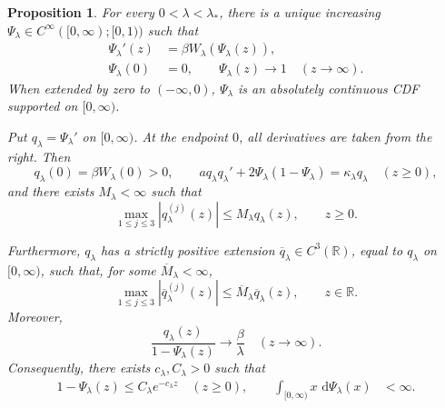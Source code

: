 \documentclass[a4paper,fleqn]{cas-sc}
\numberwithin{equation}{section}
\theoremstyle{plain}
\newtheorem{proposition}[theorem]{Proposition}
\theoremstyle{definition}
\newcommand{\dd}{\,\mathrm d}
\begin{document}
\begin{proposition}
\label{prop:hard-edge-distribution}
For every $0<\lambda<\lambda_*$, there is a unique increasing
$\Psi_\lambda\in C^\infty([0,\infty);[0,1))$ such that
\begin{equation}
\begin{aligned}
 \Psi_\lambda'(z)&=\beta W_\lambda(\Psi_\lambda(z)),\\
 \Psi_\lambda(0)&=0,\qquad
 \Psi_\lambda(z)\longrightarrow1
 \quad(z\to\infty).
\end{aligned}
 \label{eq:Psi-subcritical-definition}
\end{equation}
When extended by zero to $(-\infty,0)$, $\Psi_{\lambda}$ is an absolutely continuous CDF supported on
$[0,\infty)$.

Put $q_\lambda=\Psi_\lambda'$ on $[0,\infty)$. At the endpoint $0$,
all derivatives are taken from the right.  Then
\begin{equation}
 q_\lambda(0)=\beta W_\lambda(0)>0,
 \qquad
 a q_\lambda q_\lambda'
 +2\Psi_\lambda(1-\Psi_\lambda)
 =\kappa_\lambda q_\lambda
 \quad(z\ge0),
 \label{eq:lower-profile-equation}
\end{equation}
and there exists $M_\lambda<\infty$ such that
\begin{equation}
 \max_{1\le j\le3}|q_\lambda^{(j)}(z)|
 \le M_\lambda q_\lambda(z),
 \qquad z\ge0.
 \label{eq:subcritical-relative-bounds}
\end{equation}

Furthermore, $q_\lambda$ has a strictly positive extension
$\overline q_\lambda\in C^3(\mathbb R)$, equal to $q_\lambda$ on
$[0,\infty)$, such that, for some $\overline M_\lambda<\infty$,
\begin{equation}
 \max_{1\le j\le3}|\overline q_\lambda^{(j)}(z)|
 \le \overline M_\lambda\overline q_\lambda(z),
 \qquad z\in\mathbb R.
 \label{eq:q-extension-bounds}
\end{equation}
Moreover,
\begin{equation}
 \frac{q_\lambda(z)}{1-\Psi_\lambda(z)}
 \longrightarrow\frac\beta\lambda
 \quad(z\to\infty).
 \label{eq:subcritical-right-tail}
\end{equation}
Consequently, there exists $c_\lambda,C_\lambda>0$ such that
\[
\begin{aligned}
 1-\Psi_\lambda(z)\le C_\lambda e^{-c_\lambda z}
 \quad(z\ge0),\qquad
 \int_{[0,\infty)}x\,\dd\Psi_\lambda(x)&<\infty.
\end{aligned}
\]

\end{proposition}
\end{document}
